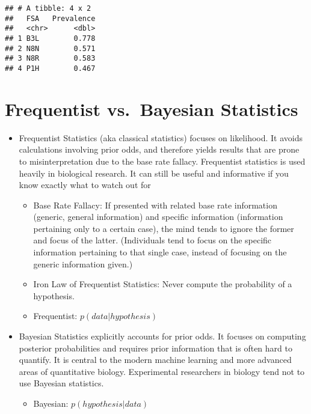 \documentclass[
]{article}
\providecommand{\tightlist}{%
  \setlength{\itemsep}{0pt}\setlength{\parskip}{0pt}}
\begin{document}
\begin{verbatim}
## # A tibble: 4 x 2
##   FSA   Prevalence
##   <chr>      <dbl>
## 1 B3L        0.778
## 2 N8N        0.571
## 3 N8R        0.583
## 4 P1H        0.467
\end{verbatim}

\hypertarget{frequentist-vs.-bayesian-statistics}{%
\section{Frequentist vs.~Bayesian
Statistics}\label{frequentist-vs.-bayesian-statistics}}

\begin{itemize}
\item
  Frequentist Statistics (aka classical statistics) focuses on
  likelihood. It avoids calculations involving prior odds, and therefore
  yields results that are prone to misinterpretation due to the base
  rate fallacy. Frequentist statistics is used heavily in biological
  research. It can still be useful and informative if you know exactly
  what to watch out for

  \begin{itemize}
  \item
    Base Rate Fallacy: If presented with related base rate information
    (generic, general information) and specific information (information
    pertaining only to a certain case), the mind tends to ignore the
    former and focus of the latter. (Individuals tend to focus on the
    specific information pertaining to that single case, instead of
    focusing on the generic information given.)
  \item
    Iron Law of Frequentist Statistics: Never compute the probability of
    a hypothesis.
  \item
    Frequentist: \(p(data|hypothesis)\)
  \end{itemize}
\item
  Bayesian Statistics explicitly accounts for prior odds. It focuses on
  computing posterior probabilities and requires prior information that
  is often hard to quantify. It is central to the modern machine
  learning and more advanced areas of quantitative biology. Experimental
  researchers in biology tend not to use Bayesian statistics.

  \begin{itemize}
  \tightlist
  \item
    Bayesian: \(p(hypothesis|data)\)
  \end{itemize}
\end{itemize}
\end{document}
